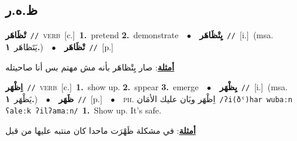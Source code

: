 \documentclass[10pt,a4paper,twoside]{article} %
\begin{document}
\begin{multicols}{2}
{{{{{\vspace{-3mm}
\subsection*{\color{blue}\foreignlanguage{arabic}{ظ.ه.ر}\color{blue}{}} 

{\setlength\topsep{0pt}\textbf{\foreignlanguage{arabic}{تْظَاهَر}}\ {\color{gray}\texttt{//}\color{black}}\ \textsc{verb}\ [c.]\ \textbf{1.}~pretend  \textbf{2.}~demonstrate\ \ $\bullet$\ \ \setlength\topsep{0pt}\textbf{\foreignlanguage{arabic}{يِتْظَاهَر}}\ {\color{gray}\texttt{//}\color{black}}\ [i.]\ \color{gray}(msa. \foreignlanguage{arabic}{يَتَظاهَر}~\foreignlanguage{arabic}{\textbf{١.}})\color{black}\ \ $\bullet$\ \ \setlength\topsep{0pt}\textbf{\foreignlanguage{arabic}{تْظَاهَر}}\ {\color{gray}\texttt{//}\color{black}}\ [p.]\  \begin{flushright}\color{gray}\foreignlanguage{arabic}{\textbf{\underline{\foreignlanguage{arabic}{أمثلة}}}: صار يِتْظاهَر بأنه مش مهتم بس أنا صاحيتله}\end{flushright}\color{black}} \vspace{2mm}

{\setlength\topsep{0pt}\textbf{\foreignlanguage{arabic}{اِظْهَر}}\ {\color{gray}\texttt{//}\color{black}}\ \textsc{verb}\ [c.]\ \textbf{1.}~show up.  \textbf{2.}~sppear  \textbf{3.}~emerge\ \ $\bullet$\ \ \setlength\topsep{0pt}\textbf{\foreignlanguage{arabic}{يِظْهَر}}\ {\color{gray}\texttt{//}\color{black}}\ [i.]\ \color{gray}(msa. \foreignlanguage{arabic}{يَظْهَر}~\foreignlanguage{arabic}{\textbf{١.}})\color{black}\ \ $\bullet$\ \ \setlength\topsep{0pt}\textbf{\foreignlanguage{arabic}{ظَهَر}}\ {\color{gray}\texttt{//}\color{black}}\ [p.]\ \ $\bullet$\ \ \textsc{ph.} \color{gray} \foreignlanguage{arabic}{اِظْهَر وبَان عليك الأمَان}\color{black}\ {\color{gray}\texttt{/{\sffamily ʔi(ðˤ)har wubaːn ʕaleːk ʔilʔamaːn}/}\color{black}}\ \textbf{1.}~Show up. It's safe.\  \begin{flushright}\color{gray}\foreignlanguage{arabic}{\textbf{\underline{\foreignlanguage{arabic}{أمثلة}}}: في مشكلة ظَهْرَت ماحدا كان منتبه عليها من قبل}\end{flushright}\color{black}} \vspace{2mm}

}}}}}
\end{multicols}
\end{document}
